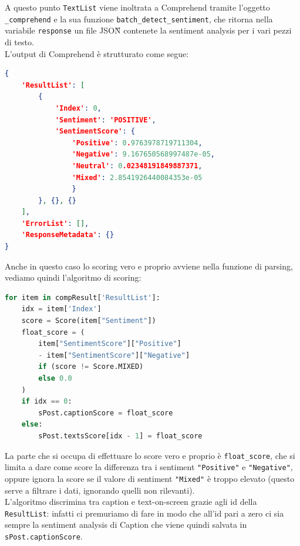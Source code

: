 A questo punto \verb+TextList+ viene inoltrata a Comprehend tramite l'oggetto \verb+_comprehend+ e la sua
funzione \verb+batch_detect_sentiment+, che ritorna nella variabile \verb+response+ un file JSON\G{}
contenete la sentiment analysis per i vari pezzi di testo. \\
L'output di Comprehend è strutturato come segue:
\begin{lstlisting}[language=JSON]
{
    'ResultList': [
        {
            'Index': 0, 
            'Sentiment': 'POSITIVE', 
            'SentimentScore': {
                'Positive': 0.9763978719711304, 
                'Negative': 9.167650568997487e-05, 
                'Neutral': 0.02348191849887371, 
                'Mixed': 2.8541926440084353e-05
                }
        }, {}, {}
    ], 
    'ErrorList': [], 
    'ResponseMetadata': {}
}
\end{lstlisting}
Anche in questo caso lo scoring vero e proprio avviene nella funzione di parsing, vediamo quindi
l'algoritmo di scoring:
\begin{lstlisting}[language=Python]
for item in compResult['ResultList']:
    idx = item['Index']
    score = Score(item["Sentiment"])
    float_score = (
        item["SentimentScore"]["Positive"] 
        - item["SentimentScore"]["Negative"]
        if (score != Score.MIXED)
        else 0.0
    )
    if idx == 0:
        sPost.captionScore = float_score
    else:
        sPost.textsScore[idx - 1] = float_score
\end{lstlisting}
La parte che si occupa di effettuare lo score vero e proprio è \verb+float_score+, che si limita
a dare come score la differenza tra i sentiment \verb+"Positive"+ e \verb+"Negative"+, oppure ignora la score se 
il valore di sentiment \verb+"Mixed"+ è troppo elevato (questo serve a filtrare i dati,
ignorando quelli non rilevanti).\\
L'algoritmo discrimina tra caption e text-on-screen grazie agli id
della \verb+ResultList+: infatti ci premuriamo di fare in modo che all'id pari a zero ci sia sempre la sentiment 
analysis di Caption che viene quindi salvata in \verb+sPost.captionScore+.

